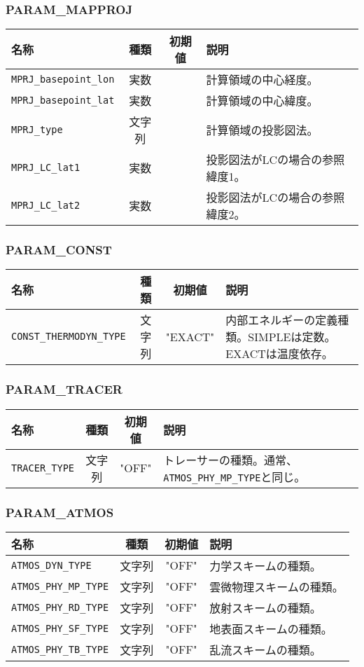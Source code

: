 \subsubsection{PARAM\_MAPPROJ}
\begin{tabularx}{150mm}{|l|c|c|X|} \hline
 \rowcolor[gray]{0.9} 名称 & 種類 & 初期値 & 説明 \\ \hline
 \verb|MPRJ_basepoint_lon| & 実数 &  & 計算領域の中心経度。 \\ \hline
 \verb|MPRJ_basepoint_lat| & 実数 &  & 計算領域の中心緯度。 \\ \hline
 \verb|MPRJ_type| & 文字列 &  & 計算領域の投影図法。 \\ \hline
 \verb|MPRJ_LC_lat1| & 実数 &  & 投影図法がLCの場合の参照緯度1。 \\ \hline
 \verb|MPRJ_LC_lat2| & 実数 &  & 投影図法がLCの場合の参照緯度2。 \\ \hline
\end{tabularx}


\subsubsection{PARAM\_CONST}
\begin{tabularx}{150mm}{|l|c|c|X|} \hline
 \rowcolor[gray]{0.9} 名称 & 種類 & 初期値 & 説明 \\ \hline
 \verb|CONST_THERMODYN_TYPE| & 文字列 & "EXACT" & 内部エネルギーの定義種類。SIMPLEは定数。EXACTは温度依存。 \\ \hline
\end{tabularx}


\subsubsection{PARAM\_TRACER}
\begin{tabularx}{150mm}{|l|c|c|X|} \hline
 \rowcolor[gray]{0.9} 名称 & 種類 & 初期値 & 説明 \\ \hline
 \verb|TRACER_TYPE| & 文字列 & "OFF" & トレーサーの種類。通常、\verb|ATMOS_PHY_MP_TYPE|と同じ。 \\ \hline
\end{tabularx}


\subsubsection{PARAM\_ATMOS}
\begin{tabularx}{150mm}{|l|c|c|X|} \hline
 \rowcolor[gray]{0.9} 名称 & 種類 & 初期値 & 説明 \\ \hline
 \verb|ATMOS_DYN_TYPE| & 文字列 & "OFF" & 力学スキームの種類。 \\ \hline
 \verb|ATMOS_PHY_MP_TYPE| & 文字列 & "OFF" & 雲微物理スキームの種類。 \\ \hline
 \verb|ATMOS_PHY_RD_TYPE| & 文字列 & "OFF" & 放射スキームの種類。 \\ \hline
 \verb|ATMOS_PHY_SF_TYPE| & 文字列 & "OFF" & 地表面スキームの種類。 \\ \hline
 \verb|ATMOS_PHY_TB_TYPE| & 文字列 & "OFF" & 乱流スキームの種類。 \\ \hline
\end{tabularx}


